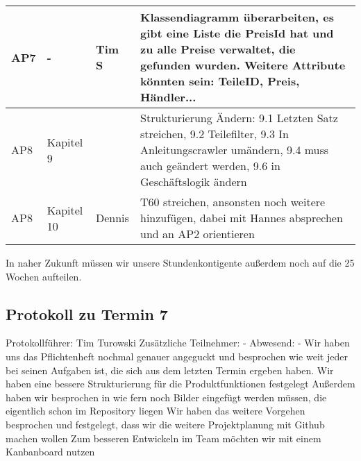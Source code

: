 \begin{flushleft}
\begin{longtable}{p{3cm}p{2cm}p{2cm}p{10cm}}
		AP7 & - & Tim S &  Klassendiagramm überarbeiten, es gibt eine Liste die PreisId hat und zu alle Preise verwaltet, die gefunden wurden. Weitere Attribute könnten sein: TeileID, Preis, Händler...\\ \midrule
		AP8 & Kapitel 9 &  & Strukturierung Ändern: 9.1 Letzten Satz streichen, 9.2 Teilefilter, 9.3 In Anleitungscrawler umändern, 9.4 muss auch geändert werden, 9.6 in Geschäftslogik ändern \\ \midrule
		AP8 & Kapitel 10 & Dennis &  T60 streichen, ansonsten noch weitere hinzufügen, dabei mit Hannes absprechen und an AP2 orientieren \\ 
		\bottomrule
	\end{longtable}
\end{flushleft}
In naher Zukunft müssen wir unsere Stundenkontigente außerdem noch auf die 25 Wochen aufteilen. 

\subsection{Protokoll zu Termin 7}
Protokollführer: Tim Turowski \newline
Zusätzliche Teilnehmer: - \newline
Abwesend: - \newline \newline
Wir haben uns das Pflichtenheft nochmal genauer angeguckt und besprochen wie weit jeder bei seinen Aufgaben ist, die sich aus dem letzten Termin ergeben haben. \newline
Wir haben eine bessere Strukturierung für die Produktfunktionen festgelegt \newline
Außerdem haben wir besprochen in wie fern noch Bilder eingefügt werden müssen, die eigentlich schon im Repository liegen \newline
Wir haben das weitere Vorgehen besprochen und festgelegt, dass wir die weitere Projektplanung mit Github machen wollen \newline
Zum besseren Entwickeln im Team möchten wir mit einem Kanbanboard nutzen \newline

